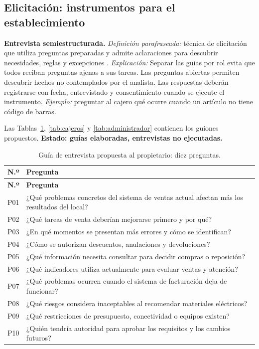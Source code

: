 \documentclass[onecolumn,12pt,a4paper]{IEEEtran}
\begin{document}
\subsection{Elicitación: instrumentos para el establecimiento}

\textbf{Entrevista semiestructurada.} \emph{Definición parafraseada:} técnica de elicitación que utiliza preguntas preparadas y admite aclaraciones para descubrir necesidades, reglas y excepciones \cite{ireb2023,wiegers2013}. \emph{Explicación:} Separar las guías por rol evita que todos reciban preguntas ajenas a sus tareas. Las preguntas abiertas permiten descubrir hechos no contemplados por el analista. Las respuestas deberán registrarse con fecha, entrevistado y consentimiento cuando se ejecute el instrumento. \emph{Ejemplo:} preguntar al cajero qué ocurre cuando un artículo no tiene código de barras.

Las Tablas~\ref{tab:propietario}, \ref{tab:cajeros} y \ref{tab:administrador} contienen los guiones propuestos. \textbf{Estado: guías elaboradas, entrevistas no ejecutadas.}

\small
\begin{longtable}{@{}p{1.0cm}p{14.3cm}@{}}
\caption{Guía de entrevista propuesta al propietario: diez preguntas.}\label{tab:propietario}\\
\toprule\textbf{N.º} & \textbf{Pregunta}\\\midrule\endfirsthead
\toprule\textbf{N.º} & \textbf{Pregunta}\\\midrule\endhead
P01 & ¿Qué problemas concretos del sistema de ventas actual afectan más los resultados del local?\\
P02 & ¿Qué tareas de venta deberían mejorarse primero y por qué?\\
P03 & ¿En qué momentos se presentan más errores y cómo se identifican?\\
P04 & ¿Cómo se autorizan descuentos, anulaciones y devoluciones?\\
P05 & ¿Qué información necesita consultar para decidir compras o reposición?\\
P06 & ¿Qué indicadores utiliza actualmente para evaluar ventas y atención?\\
P07 & ¿Qué problemas ocurren cuando el sistema de facturación deja de funcionar?\\
P08 & ¿Qué riesgos considera inaceptables al recomendar materiales eléctricos?\\
P09 & ¿Qué restricciones de presupuesto, conectividad o equipos existen?\\
P10 & ¿Quién tendría autoridad para aprobar los requisitos y los cambios futuros?\\
\bottomrule\end{longtable}
\end{document}
